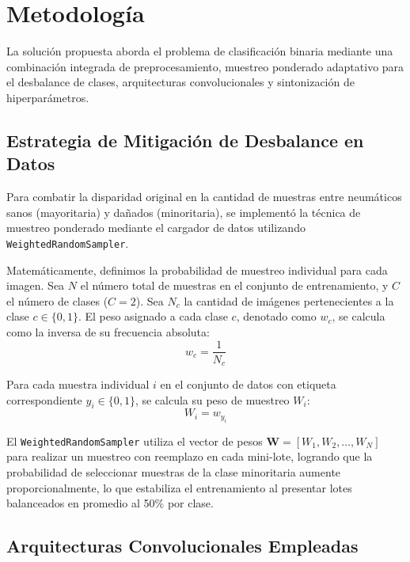 \section{Metodología}
La solución propuesta aborda el problema de clasificación binaria mediante una combinación integrada de preprocesamiento, muestreo ponderado adaptativo para el desbalance de clases, arquitecturas convolucionales y sintonización de hiperparámetros.

\subsection{Estrategia de Mitigación de Desbalance en Datos}
Para combatir la disparidad original en la cantidad de muestras entre neumáticos sanos (mayoritaria) y dañados (minoritaria), se implementó la técnica de muestreo ponderado mediante el cargador de datos utilizando \texttt{WeightedRandomSampler}.

Matemáticamente, definimos la probabilidad de muestreo individual para cada imagen. Sea $N$ el número total de muestras en el conjunto de entrenamiento, y $C$ el número de clases ($C=2$). Sea $N_c$ la cantidad de imágenes pertenecientes a la clase $c \in \{0, 1\}$. El peso asignado a cada clase $c$, denotado como $w_c$, se calcula como la inversa de su frecuencia absoluta:
\begin{equation}
w_c = \frac{1}{N_c}
\end{equation}

Para cada muestra individual $i$ en el conjunto de datos con etiqueta correspondiente $y_i \in \{0, 1\}$, se calcula su peso de muestreo $W_i$:
\begin{equation}
W_i = w_{y_i}
\end{equation}

El \texttt{WeightedRandomSampler} utiliza el vector de pesos $\mathbf{W} = [W_1, W_2, \dots, W_N]$ para realizar un muestreo con reemplazo en cada mini-lote, logrando que la probabilidad de seleccionar muestras de la clase minoritaria aumente proporcionalmente, lo que estabiliza el entrenamiento al presentar lotes balanceados en promedio al 50\% por clase.

\subsection{Arquitecturas Convolucionales Empleadas}

